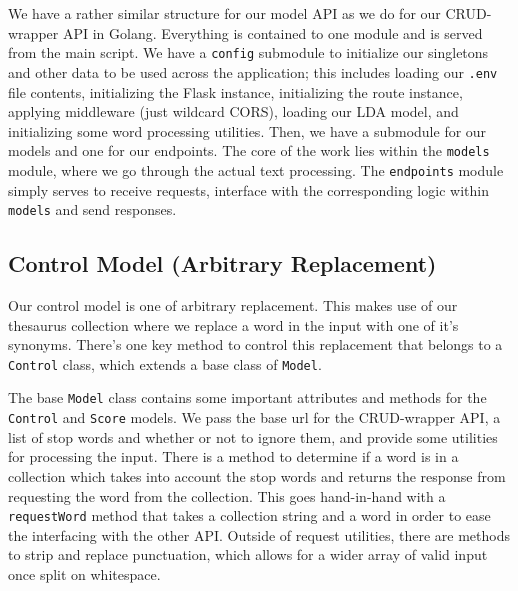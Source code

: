 \documentclass[11pt, twoside, reqno]{book}
\begin{document}
We have a rather similar structure for our model API as we do for our CRUD-wrapper API in Golang. Everything is contained to one module and is served from the main script. We have a \texttt{config} submodule to initialize our singletons and other data to be used across the application; this includes loading our \texttt{.env} file contents, initializing the Flask instance, initializing the route instance, applying middleware (just wildcard CORS), loading our LDA model, and initializing some word processing utilities. Then, we have a submodule for our models and one for our endpoints. The core of the work lies within the \texttt{models} module, where we go through the actual text processing. The \texttt{endpoints} module simply serves to receive requests, interface with the corresponding logic within \texttt{models} and send responses.

\subsection{Control Model (Arbitrary Replacement)}

Our control model is one of arbitrary replacement. This makes use of our thesaurus collection where we replace a word in the input with one of it's synonyms. There's one key method to control this replacement that belongs to a \texttt{Control} class, which extends a base class of \texttt{Model}.

The base \texttt{Model} class contains some important attributes and methods for the \texttt{Control} and \texttt{Score} models. We pass the base url for the CRUD-wrapper API, a list of stop words and whether or not to ignore them, and provide some utilities for processing the input. There is a method to determine if a word is in a collection which takes into account the stop words and returns the response from requesting the word from the collection. This goes hand-in-hand with a \texttt{requestWord} method that takes a collection string and a word in order to ease the interfacing with the other API. Outside of request utilities, there are methods to strip and replace punctuation, which allows for a wider array of valid input once split on whitespace.
\end{document}
